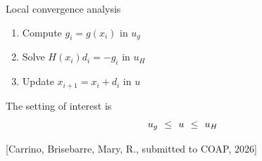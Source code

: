 \documentclass{beamer}
\begin{document}
\begin{frame}{Local convergence analysis}
{  \begin{tcolorbox}[
  title=Floating point Newton's method,
      colback=white,
      colframe=gray!40,
      boxrule=0.4pt,
      arc=4pt,
      left=1pt, right=1pt, top=1pt, bottom=1pt,
    ]
  \begin{enumerate}
   \item  Compute $g_i = g(x_i)$        in \textcolor{gray!70!black}{$u_g$} \\
 \item  Solve $H(x_i)d_i = -g_i$     in \textcolor{myblue!70!black}{$u_H$} \\
 \item  Update $x_{i+1} = x_i + d_i$  in \textcolor{myyel!70!black}{$u$} \\
  \end{enumerate}
  \end{tcolorbox}
  The setting of interest is
  \begin{equation*}
    \tikz[remember picture, baseline=(ug.base)]{\node[inner sep=1pt] (ug) {$u_g$};}
    \;\leq\;
    \tikz[remember picture, baseline=(u.base)]{\node[inner sep=1pt] (u) {$u$};}
    \;\leq\;
    \tikz[remember picture, baseline=(uH.base)]{\node[inner sep=1pt] (uH) {$u_H$};}
  \end{equation*}
  }
  \small{ \textcolor{mygreen}{[Carrino, Brisebarre, Mary, R., submitted to COAP, 2026]}}
\end{frame}
\end{document}
